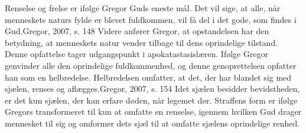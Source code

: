 Renselse og frelse er ifølge Gregor Guds eneste mål. Det vil sige, at alle, når menneskets naturs fylde er blevet fuldkommen, vil få del i det gode, som findes i Gud.{Gregor, 2007, s. 148} Videre anfører Gregor, at opstandelsen har den betydning, at menneskets natur vender tilbage til dens oprindelige tilstand. Denne opfattelse tager udgangspunkt i apokatastasislæren. Ifølge Gregor genvinder alle den oprindelige fuldkommenhed, og denne genoprettelsen opfatter han som en helbredelse. Helbredelsen omfatter, at det, der har blandet sig med sjælen, renses og aflægges.{Gregor, 2007, s. 154} Idet sjælen besidder bevidstheden, er det kun sjælen, der kan erfare døden, når legemet dør. Straffens form er ifølge Gregors transformeret til kun at omfatte en renselse, igennem hvilken Gud drager mennesket til sig og omformer dets sjæl til at omfatte sjælens oprindelige renhed.